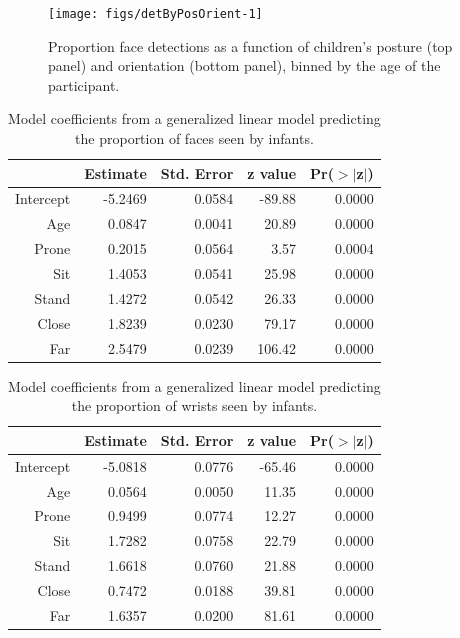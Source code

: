 \documentclass[10pt, letterpaper]{article}
\newenvironment{CodeChunk}{}{}
\begin{document}
\begin{CodeChunk}
\begin{figure}[h]

{\centering \texttt{[image: figs/detByPosOrient-1]} 

}

\caption[Proportion face detections as a function of children's posture (top panel) and orientation (bottom panel), binned by the age of the participant]{Proportion face detections as a function of children's posture (top panel) and orientation (bottom panel), binned by the age of the participant.}\label{fig:detByPosOrient}
\end{figure}
\end{CodeChunk}

\begin{table}[H]
\centering
\begin{tabular}{rrrrr}
  \hline
 & Estimate & Std. Error & z value & Pr($>$$|$z$|$) \\ 
  \hline
Intercept & -5.2469 & 0.0584 & -89.88 & 0.0000 \\ 
  Age & 0.0847 & 0.0041 & 20.89 & 0.0000 \\ 
  Prone & 0.2015 & 0.0564 & 3.57 & 0.0004 \\ 
  Sit & 1.4053 & 0.0541 & 25.98 & 0.0000 \\ 
  Stand & 1.4272 & 0.0542 & 26.33 & 0.0000 \\ 
  Close & 1.8239 & 0.0230 & 79.17 & 0.0000 \\ 
  Far & 2.5479 & 0.0239 & 106.42 & 0.0000 \\ 
   \hline
\end{tabular}
\caption{Model coefficients from a generalized linear model predicting the proportion of faces seen by infants.} 
\end{table}

\begin{table}[H]
\centering
\begin{tabular}{rrrrr}
  \hline
 & Estimate & Std. Error & z value & Pr($>$$|$z$|$) \\ 
  \hline
Intercept & -5.0818 & 0.0776 & -65.46 & 0.0000 \\ 
  Age & 0.0564 & 0.0050 & 11.35 & 0.0000 \\ 
  Prone & 0.9499 & 0.0774 & 12.27 & 0.0000 \\ 
  Sit & 1.7282 & 0.0758 & 22.79 & 0.0000 \\ 
  Stand & 1.6618 & 0.0760 & 21.88 & 0.0000 \\ 
  Close & 0.7472 & 0.0188 & 39.81 & 0.0000 \\ 
  Far & 1.6357 & 0.0200 & 81.61 & 0.0000 \\ 
   \hline
\end{tabular}
\caption{Model coefficients from a generalized linear model predicting the proportion of wrists seen by infants.} 
\end{table}
\end{document}
